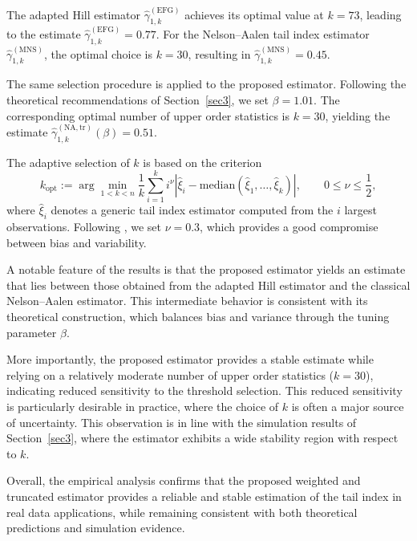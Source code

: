 \documentclass[reqno,openbib,runningheads,a4paper,12pt]{amsart}%
\begin{document}
\noindent The adapted Hill estimator $\widehat{\gamma}_{1,k}^{(\mathrm{EFG})}$
achieves its optimal value at $k=73$, leading to the estimate $\widehat{\gamma
}_{1,k}^{(\mathrm{EFG})}=0.77$. For the Nelson--Aalen tail index estimator
$\widehat{\gamma}_{1,k}^{(\mathrm{MNS})}$, the optimal choice is $k=30$,
resulting in $\widehat{\gamma}_{1,k}^{(\mathrm{MNS})}=0.45$. \smallskip

\noindent The same selection procedure is applied to the proposed estimator.
Following the theoretical recommendations of Section~\ref{sec3}, we set
$\beta=1.01$. The corresponding optimal number of upper order statistics is
$k=30$, yielding the estimate $\widehat{\gamma}_{1,k}^{(\mathrm{NA,tr})}%
(\beta)=0.51$.\smallskip

\noindent The adaptive selection of $k$ is based on the criterion
\begin{equation}
k_{\mathrm{opt}}:=\arg\min_{1<k<n}\frac{1}{k}\sum_{i=1}^{k}i^{\nu}\left\vert
\widehat{\xi}_{i}-\mathrm{median}\left(  \widehat{\xi}_{1},\ldots
,\widehat{\xi}_{k}\right)  \right\vert ,\qquad0\leq\nu\leq\frac{1}{2},
\label{kopt}%
\end{equation}
where $\widehat{\xi}_{i}$ denotes a generic tail index estimator computed from
the $i$ largest observations. Following \cite{NF2004}, we set $\nu=0.3$, which
provides a good compromise between bias and variability.\smallskip

\noindent A notable feature of the results is that the proposed estimator
yields an estimate that lies between those obtained from the adapted Hill
estimator and the classical Nelson--Aalen estimator. This intermediate
behavior is consistent with its theoretical construction, which balances bias
and variance through the tuning parameter $\beta$.\smallskip

\noindent More importantly, the proposed estimator provides a stable estimate
while relying on a relatively moderate number of upper order statistics
($k=30$), indicating reduced sensitivity to the threshold selection. This
reduced sensitivity is particularly desirable in practice, where the choice of
$k$ is often a major source of uncertainty. This observation is in line with
the simulation results of Section~\ref{sec3}, where the estimator exhibits a
wide stability region with respect to $k$.\smallskip

\noindent Overall, the empirical analysis confirms that the proposed weighted
and truncated estimator provides a reliable and stable estimation of the tail
index in real data applications, while remaining consistent with both
theoretical predictions and simulation evidence.
\end{document}
